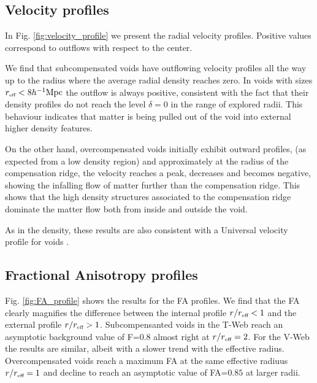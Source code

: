 \documentclass[a4,useAMS,usenatbib,usegraphicx]{mn2e}
\newcommand{\hMpc}{{\ifmmode{h^{-1}{\rm Mpc}}\else{$h^{-1}$Mpc}\fi}}
\newcommand{\reff}{{\ifmmode{r_{\mbox{\tiny eff}}}\else{$r_{\mbox{\tiny eff}}$}\fi}}
\begin{document}
\subsection{Velocity profiles}
\label{subsec:velocity_voids}

In Fig. \ref{fig:velocity_profile} we present the radial velocity
profiles. 
Positive values correspond to outflows with respect to the center. 


We find that subcompensated voids have outflowing velocity profiles
all the way up to the radius where the average radial
density reaches zero.
In voids with sizes $\reff <8\hMpc$ the outflow is always
positive, consistent with the fact that their density profiles do not
reach the level $\delta=0$ in the range of explored radii.
This behaviour indicates that matter is being pulled out of the void
into external higher density features.


On the other hand, overcompensated voids initially exhibit outward
profiles, (as expected from a low density region) and approximately at
the radius of the compensation ridge, the velocity reaches a peak,
decreases and becomes negative, showing the infalling flow of matter
further than the compensation ridge. 
This shows that the high density structures associated to the
compensation ridge dominate the matter flow both from inside and
outside the void.

As in the density, these results are also consistent with a Universal
velocity profile for voids \citep{Paz13, Hamaus14}.

\subsection{Fractional Anisotropy profiles}
\label{subsec:FA_voids}



Fig. \ref{fig:FA_profile} shows the results for the FA profiles.
We find that the FA clearly magnifies the difference between the
internal profile $r/\reff <1$ and the external profile $r/\reff >1$. 
Subcompensanted voids in the T-Web reach an asymptotic background
value of F=$0.8$ almost right at $r/\reff =2$. 
For the V-Web the results are similar, albeit with a slower trend with
the effective radius. 
Overcompensated voids reach a maximum FA at the same effective radiuus
$r/\reff =1$ and decline to reach an asymptotic value of FA=$0.85$
at larger radii.
\end{document}
